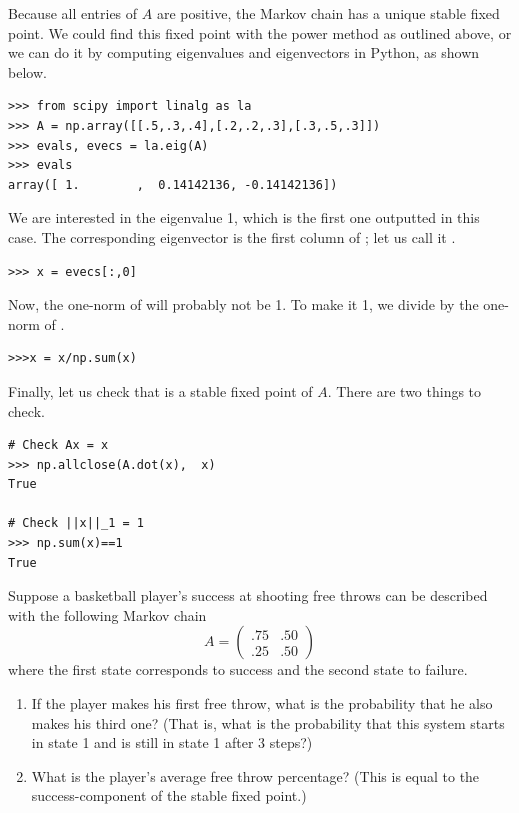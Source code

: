 Because all entries of $A$ are positive, the Markov chain has a unique stable fixed point. 
We could find this fixed point with the power method as outlined above, or we can do it by computing eigenvalues and eigenvectors in Python, as shown below.
\begin{lstlisting}
>>> from scipy import linalg as la
>>> A = np.array([[.5,.3,.4],[.2,.2,.3],[.3,.5,.3]])
>>> evals, evecs = la.eig(A)
>>> evals
array([ 1.        ,  0.14142136, -0.14142136])
\end{lstlisting}
We are interested in the eigenvalue 1, which is the first one outputted in this case. 
The corresponding eigenvector is the first column of ; let us call it .
\begin{lstlisting}
>>> x = evecs[:,0]
\end{lstlisting}
Now, the one-norm of  will probably not be 1. To make it 1, we divide by the one-norm of .
\begin{lstlisting}
>>>x = x/np.sum(x)
\end{lstlisting}
Finally, let us check that  is a stable fixed point of $A$. There are two things to check.
\begin{lstlisting}
# Check Ax = x
>>> np.allclose(A.dot(x),  x)
True

# Check ||x||_1 = 1
>>> np.sum(x)==1
True
\end{lstlisting}


\begin{problem}
Suppose a basketball player's success at shooting free throws can be described with the following Markov chain
\[
A = \begin{pmatrix}.75&.50\\.25&.50\end{pmatrix}
\]
where the first state corresponds to success and the second state to failure.
\begin{enumerate}
\item If the player makes his first free throw, what is the probability that he also makes his third one? 
(That is, what is the probability that this system starts in state 1 and is still in state 1 after 3 steps?)
\item What is the player's average free throw percentage? 
(This is equal to the success-component of the stable fixed point.)
\end{enumerate}
\label{prob:markov_freethrow}
\end{problem}

